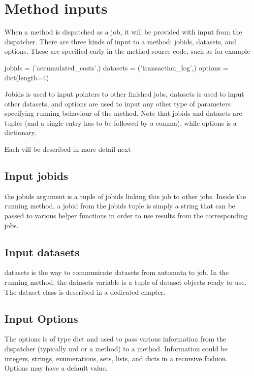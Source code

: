 \section{Method inputs}

When a method is dispatched as a job, it will be provided with input
from the dispatcher.  There are three kinds of input to a method:
jobids, datasets, and options.  These are specified early in the
method source code, such as for example

\begin{python}
jobids = ('accumulated_costs',)
datasets = ('transaction_log',)
options = dict(length=4)
\end{python}

Jobids is used to input pointers to other finished jobs, datasets is
used to input other datasets, and options are used to input any other
type of parameters specifying running behaviour of the method.  Note
that jobids and datasets are tuples (and a single entry has to be
followed by a comma), while options is a dictionary.

Each vill be described in more detail next



\subsection{Input jobids}
the jobids argument is a tuple of jobids linking this job to other
jobs.  Inside the running method, a jobid from the jobids tuple is
simply a string that can be passed to various helper functions in
order to use results from the corresponding jobs.



\subsection{Input datasets}
datasets is the way to communicate datasets from automata to job.  In
the running method, the datasets variable is a tuple of dataset
objects ready to use.  The dataset class is described in a dedicated
chapter.




\subsection{Input Options}

The options is of type dict and used to pass various information from
the dispatcher (typically urd or a method) to a method.  Information
could be integers, strings, enumerations, sets, lists, and dicts in a
recursive fashion.  Options may have a default value.

